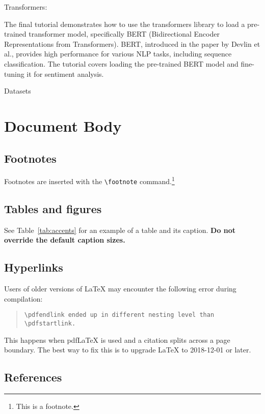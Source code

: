 \documentclass[11pt]{article}
\begin{document}
Transformers:

The final tutorial demonstrates how to use the transformers library to load a pre-trained transformer model, specifically BERT (Bidirectional Encoder Representations from Transformers). BERT, introduced in the paper by Devlin et al., provides high performance for various NLP tasks, including sequence classification. The tutorial covers loading the pre-trained BERT model and fine-tuning it for sentiment analysis.

Datasets

\cite{sarcasm-dataset}
\cite{fake-news-dataset}


\section{Document Body}

\subsection{Footnotes}

Footnotes are inserted with the \verb|\footnote| command.\footnote{This is a footnote.}

\subsection{Tables and figures}

See Table~\ref{tab:accents} for an example of a table and its caption.
\textbf{Do not override the default caption sizes.}

\subsection{Hyperlinks}

Users of older versions of \LaTeX{} may encounter the following error during compilation: 
\begin{quote}
\tt\verb|\pdfendlink| ended up in different nesting level than \verb|\pdfstartlink|.
\end{quote}
This happens when pdf\LaTeX{} is used and a citation splits across a page boundary. The best way to fix this is to upgrade \LaTeX{} to 2018-12-01 or later.

\subsection{References}
\end{document}
